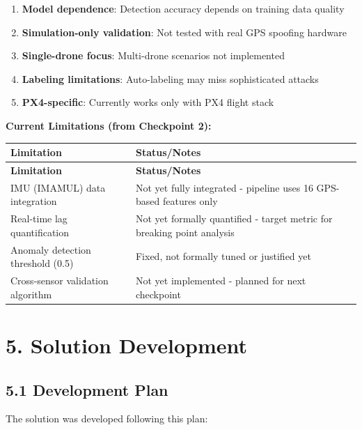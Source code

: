 \documentclass[12pt,a4paper]{article}
\begin{document}
\begin{enumerate}
    \item \textbf{Model dependence}: Detection accuracy depends on training data quality
    \item \textbf{Simulation-only validation}: Not tested with real GPS spoofing hardware
    \item \textbf{Single-drone focus}: Multi-drone scenarios not implemented
    \item \textbf{Labeling limitations}: Auto-labeling may miss sophisticated attacks
    \item \textbf{PX4-specific}: Currently works only with PX4 flight stack
\end{enumerate}

\textbf{Current Limitations (from Checkpoint 2):}
\begin{longtable}{|p{4cm}|p{11cm}|}
\hline
\textbf{Limitation} & \textbf{Status/Notes} \\
\hline
\endfirsthead
\hline
\textbf{Limitation} & \textbf{Status/Notes} \\
\hline
\endhead
\hline
IMU (IMAMUL) data integration & Not yet fully integrated - pipeline uses 16 GPS-based features only \\
\hline
Real-time lag quantification & Not yet formally quantified - target metric for breaking point analysis \\
\hline
Anomaly detection threshold (0.5) & Fixed, not formally tuned or justified yet \\
\hline
Cross-sensor validation algorithm & Not yet implemented - planned for next checkpoint \\
\hline
\end{longtable}

\newpage

\section{5. Solution Development}

\subsection{5.1 Development Plan}

The solution was developed following this plan:
\end{document}
